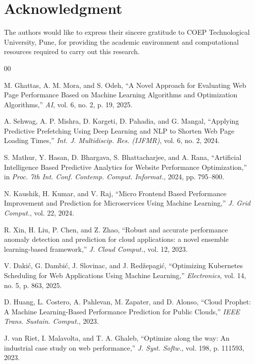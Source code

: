 \documentclass[conference]{IEEEtran}
\begin{document}

\section*{Acknowledgment}

The authors would like to express their sincere gratitude to COEP Technological University, Pune, for providing the academic environment and computational resources required to carry out this research.

\begin{thebibliography}{00}

M. Ghattas, A. M. Mora, and S. Odeh, ``A Novel Approach for Evaluating Web Page Performance Based on Machine Learning Algorithms and Optimization Algorithms,'' \textit{AI}, vol. 6, no. 2, p. 19, 2025.

A. Sehwag, A. P. Mishra, D. Kargeti, D. Pahadia, and G. Mangal, ``Applying Predictive Prefetching Using Deep Learning and NLP to Shorten Web Page Loading Times,'' \textit{Int. J. Multidiscip. Res. (IJFMR)}, vol. 6, no. 2, 2024.

S. Mathur, Y. Hasan, D. Bhargava, S. Bhattacharjee, and A. Rana, ``Artificial Intelligence Based Predictive Analytics for Website Performance Optimization,'' in \textit{Proc. 7th Int. Conf. Contemp. Comput. Informat.}, 2024, pp. 795--800.

N. Kaushik, H. Kumar, and V. Raj, ``Micro Frontend Based Performance Improvement and Prediction for Microservices Using Machine Learning,'' \textit{J. Grid Comput.}, vol. 22, 2024.

R. Xin, H. Liu, P. Chen, and Z. Zhao, ``Robust and accurate performance anomaly detection and prediction for cloud applications: a novel ensemble learning-based framework,'' \textit{J. Cloud Comput.}, vol. 12, 2023.

V. Daki\'{c}, G. Dambi\'{c}, J. Slovinac, and J. Red\v{z}epagi\'{c}, ``Optimizing Kubernetes Scheduling for Web Applications Using Machine Learning,'' \textit{Electronics}, vol. 14, no. 5, p. 863, 2025.

D. Huang, L. Costero, A. Pahlevan, M. Zapater, and D. Alonso, ``Cloud Prophet: A Machine Learning-Based Performance Prediction for Public Clouds,'' \textit{IEEE Trans. Sustain. Comput.}, 2023.

J. van Riet, I. Malavolta, and T. A. Ghaleb, ``Optimize along the way: An industrial case study on web performance,'' \textit{J. Syst. Softw.}, vol. 198, p. 111593, 2023.


\end{thebibliography}
\end{document}
